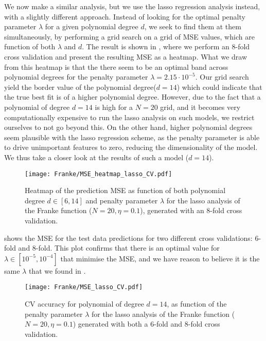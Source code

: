         We now make a similar analysis, but we use the lasso regression analysis instead, with a slightly different approach. Instead of looking for the optimal penalty parameter $\lambda$ for a given polynomial degree $d$, we seek to find them at them simultaneously, by performing a grid search on a grid of MSE values, which are function of both $\lambda$ and $d$. The result is shown in , where we perform an 8-fold cross validation and present the resulting MSE as a heatmap. 
        What we draw from this heatmap is that the there seem to be an optimal band across polynomial degrees for the penalty parameter $\lambda =2.15\cdot10^{-5}$. Our grid search yield the border value of the polynomial degree($d=14$) which could indicate that the true best fit is of a higher polynomial degree. However, due to the fact that a polynomial of degree $d=14$ is high for a $N=20$ grid, and it becomes very computationally expensive to run the lasso analysis on such models, we restrict ourselves to not go beyond this. On the other hand, higher polynomial degrees seem plausible with the lasso regression scheme, as the penalty parameter is able to drive unimportant features to zero, reducing the dimensionality of the model. We thus take a closer look at the results of such a model ($d=14$). 

        \begin{figure}
            \texttt{[image: Franke/MSE\_heatmap\_lasso\_CV.pdf]}
            \caption{Heatmap of the prediction MSE as function of both polynomial degree $d\in[6,14]$ and penalty parameter $\lambda$ for the lasso analysis of the Franke function ($N=20, \eta=0.1$), generated with an 8-fold cross validation.}
            \label{fig:gridsearch_cv_lasso}
        \end{figure}

         shows the MSE for the test data predictions for two different cross validations: 6-fold and 8-fold. This plot confirms that there is an optimal value for $\lambda\in[10^{-5}, 10^{-4}]$ that minimise the MSE, and we have reason to believe it is the same $\lambda$ that we found in .

        \begin{figure} 
            \texttt{[image: Franke/MSE\_lasso\_CV.pdf]}
            \caption{CV accuracy for polynomial of degree $d=14$, as function of the penalty parameter $\lambda$ for the lasso analysis of the Franke function ($N=20, \eta=0.1$) generated with both a 6-fold and 8-fold cross validation.}
            \label{fig:cross-validation_lasso}
        \end{figure}


